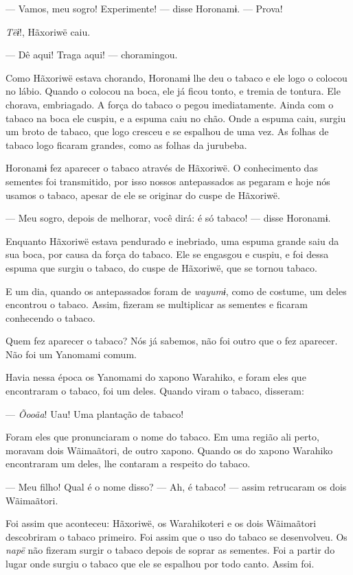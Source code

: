 --- Vamos, meu sogro! Experimente! --- disse Horonamɨ. --- Prova!

\textit{Tëɨ}!, Hãxoriwë caiu. 

--- Dê aqui! Traga aqui! --- choramingou. 

Como Hãxoriwë estava chorando, Horonamɨ lhe deu o tabaco e ele
logo o colocou no lábio. Quando o colocou na boca, ele já ficou tonto, e
tremia de tontura. Ele chorava, embriagado. A força do tabaco o pegou
imediatamente. Ainda com o tabaco na boca ele cuspiu, e a espuma caiu no
chão. Onde a espuma caiu, surgiu um broto de tabaco, que logo cresceu e
se espalhou de uma vez. As folhas de tabaco logo ficaram grandes, como as folhas da jurubeba. 

Horonamɨ fez aparecer o tabaco através de Hãxoriwë. O conhecimento das sementes foi transmitido, por isso nossos antepassados as pegaram e hoje nós usamos o tabaco, apesar de ele se originar do cuspe de Hãxoriwë. 

--- Meu sogro, depois de melhorar, você dirá: é só tabaco! --- disse
Horonamɨ. 

Enquanto Hãxoriwë estava pendurado e inebriado, uma espuma grande saiu
da sua boca, por causa da força do tabaco. Ele se engasgou e cuspiu, e
foi dessa espuma que surgiu o tabaco, do cuspe de Hãxoriwë, que se tornou
tabaco. 

E um dia, quando os antepassados foram de \textit{wayumɨ}, como de
costume, um deles encontrou o tabaco. Assim, fizeram se multiplicar as
sementes e ficaram conhecendo o tabaco. 

Quem fez aparecer o tabaco? Nós já sabemos, não foi outro que o fez
aparecer. Não foi um Yanomami comum. 

Havia nessa época os Yanomami do xapono Warahiko, e foram eles
que encontraram o tabaco, foi um deles. Quando viram o tabaco,
disseram: 

--- \textit{Õooãa}! Uau! Uma plantação de tabaco! 

Foram eles que pronunciaram o nome do tabaco. Em uma região
ali perto, moravam dois Wãimaãtori, de outro xapono. Quando os do
xapono Warahiko encontraram um deles, lhe contaram a respeito do
tabaco. 

--- Meu filho! Qual é o nome disso? 
--- Ah, é tabaco! --- assim retrucaram os dois Wãimaãtori. 

Foi assim que aconteceu: Hãxoriwë, os Warahikoteri e os dois Wãimaãtori
descobriram o tabaco primeiro. Foi assim que o uso do tabaco se
desenvolveu. Os \textit{napë} não fizeram surgir o tabaco depois de soprar
as sementes. Foi a partir do lugar onde surgiu o tabaco que ele se
espalhou por todo canto. Assim foi. 

